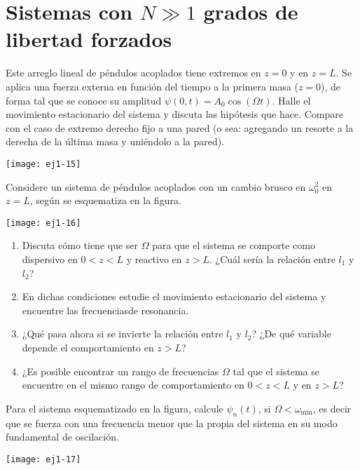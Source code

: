 \section*{Sistemas con \(N\gg 1\) grados de libertad forzados}

				
\item
\begin{minipage}[t][3.5cm]{0.6\textwidth}
Este arreglo lineal de péndulos acoplados tiene extremos en $z= 0$ y en $z= L$.
Se aplica una fuerza externa en función del tiempo a la primera masa ($z=0$), de forma tal que se conoce su amplitud $\psi(0,t)= A_0 \cos(\Omega t)$.
Halle el movimiento estacionario del sistema y discuta las hipótesis que hace.
Compare con el caso de extremo derecho fijo a una pared (o sea: agregando un resorte a la derecha de la última masa y uniéndolo a la pared). 
\end{minipage}
\begin{minipage}[c][0cm][t]{0.35\textwidth}
  \texttt{[image: ej1-15]}
\end{minipage}



\item
\begin{minipage}[t][3cm]{0.35\textwidth}
Considere un sistema de péndulos acoplados con un cambio brusco en $\omega_{0}^{2}$ en $z=L$, según se esquematiza en la figura.
\end{minipage}
\begin{minipage}[c][3cm][t]{0.6\textwidth}
  \texttt{[image: ej1-16]}
\end{minipage}
\begin{enumerate}
	\item Discuta cómo tiene que ser \(\Omega\) para que el sistema se comporte como dispersivo en \(0< z < L\) y reactivo en \(z > L\).
	¿Cuál sería la relación entre \(l_1\) y\(l_2\)?
	\item En dichas condiciones estudie el movimiento estacionario del sistema y encuentre las frecuenciasde resonancia.
	\item ¿Qué pasa ahora si se invierte la relación entre \(l_1\) y \(l_2\)?
	¿De qué variable depende el comportamiento en \(z > L\)?
	\item ¿Es posible encontrar un rango de frecuencias \(\Omega\) tal que el sistema se encuentre en el mismo rango de comportamiento en \(0< z < L\) y en \(z > L\)?
\end{enumerate}



\item
\begin{minipage}[t][3.5cm]{0.45\textwidth}
Para el sistema esquematizado en la figura, calcule $\psi_{n}(t)$, si $\Omega<\omega_\textrm{mín}$, es decir que se fuerza con una frecuencia menor que la propia del sistema en su modo fundamental de oscilación.
\end{minipage}
\begin{minipage}[c][2cm][t]{0.5\textwidth}
  \texttt{[image: ej1-17]}
\end{minipage}
